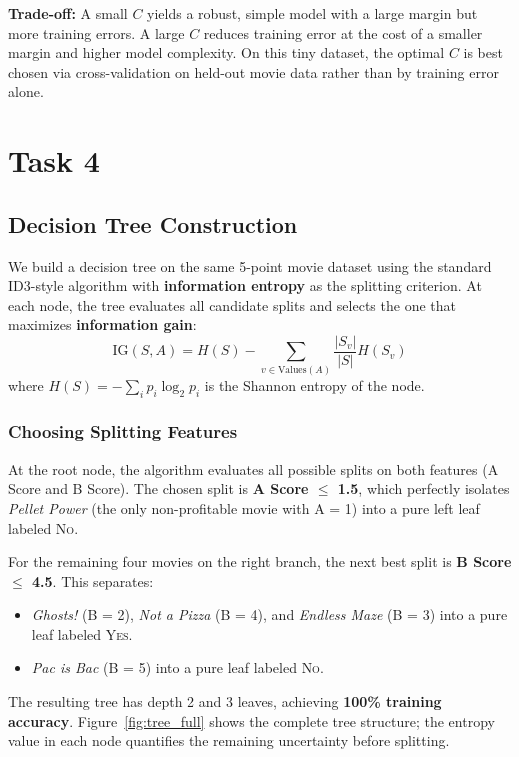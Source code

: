 \documentclass[a4paper,12pt]{article}
\begin{document}
\textbf{Trade-off:} A small $C$ yields a robust, simple model with a large margin but more training errors. A large $C$ reduces training error at the cost of a smaller margin and higher model complexity. On this tiny dataset, the optimal $C$ is best chosen via cross-validation on held-out movie data rather than by training error alone.

\section{Task 4}

\subsection{Decision Tree Construction}

We build a decision tree on the same 5-point movie dataset using the standard ID3-style algorithm with \textbf{information entropy} as the splitting criterion. At each node, the tree evaluates all candidate splits and selects the one that maximizes \textbf{information gain}:
\[
\text{IG}(S, A) = H(S) - \sum_{v \in \text{Values}(A)} \frac{|S_v|}{|S|} H(S_v)
\]
where $H(S) = -\sum_{i} p_i \log_2 p_i$ is the Shannon entropy of the node.

\subsubsection{Choosing Splitting Features}

At the root node, the algorithm evaluates all possible splits on both features (A Score and B Score). The chosen split is \textbf{A Score $\leq$ 1.5}, which perfectly isolates \textit{Pellet Power} (the only non-profitable movie with A = 1) into a pure left leaf labeled \textsc{No}.

For the remaining four movies on the right branch, the next best split is \textbf{B Score $\leq$ 4.5}. This separates:
\begin{itemize}
    \item \textit{Ghosts!} (B = 2), \textit{Not a Pizza} (B = 4), and \textit{Endless Maze} (B = 3) into a pure leaf labeled \textsc{Yes}.
    \item \textit{Pac is Bac} (B = 5) into a pure leaf labeled \textsc{No}.
\end{itemize}

The resulting tree has depth 2 and 3 leaves, achieving \textbf{100\% training accuracy}. Figure~\ref{fig:tree_full} shows the complete tree structure; the entropy value in each node quantifies the remaining uncertainty before splitting.
\end{document}
